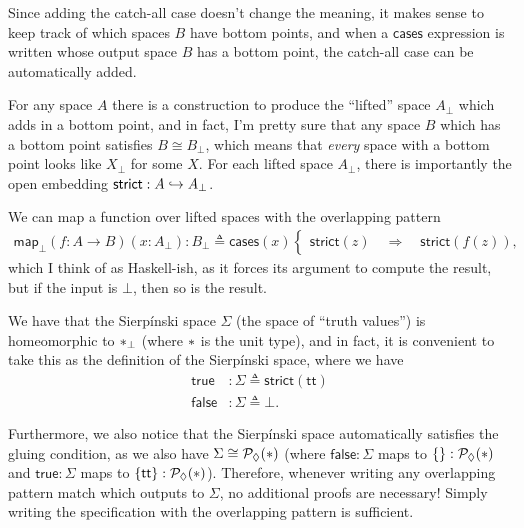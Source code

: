 Since adding the catch-all case doesn't change the meaning, it makes sense to keep track of which spaces $B$ have bottom points, and when a $\mathsf{cases}$ expression is written whose output space $B$ has a bottom point, the catch-all case can be automatically added.

For any space $A$ there is a construction to produce the ``lifted'' space $A_\bot$ which adds in a bottom point, and in fact, I'm pretty sure that any space $B$ which has a bottom point satisfies $B \cong B_\bot$, which means that \emph{every} space with a bottom point looks like $X_\bot$ for some $X$. For each lifted space $A_\bot$, there is importantly the open embedding $\mathsf{strict} : A \hookrightarrow A_\bot$.

We can map a function over lifted spaces with the overlapping pattern
\begin{align*}
\mathsf{map}_\bot(f : A \to B)(x : A_\bot) : B_\bot \triangleq
  \mathsf{cases}(x)
  \begin{cases}
  \mathsf{strict}(z) \quad \Longrightarrow \quad \mathsf{strict}(f(z)),
  \end{cases}
\end{align*}
which I think of as Haskell-ish, as it forces its argument to compute the result, but if the input is $\bot$, then so is the result.

We have that the Sierpínski space $\Sigma$ (the space of ``truth values'') is homeomorphic to $\ast_\bot$ (where $\ast$ is the unit type), and in fact, it is convenient to take this as the definition of the Sierpínski space, where we have
\begin{align*}
\mathsf{true} &: \Sigma \triangleq \mathsf{strict}(\mathsf{tt})
\\ \mathsf{false} &: \Sigma \triangleq \bot.
\end{align*}

Furthermore, we also notice that the Sierpínski space automatically satisfies the gluing condition, as we also have $\Sigma \cong \mathcal{P}_\lozenge(\ast)$ (where $\mathsf{false} : \Sigma$ maps to $\{ \} : \mathcal{P}_\lozenge(\ast)$ and $\mathsf{true} : \Sigma$ maps to $\{ \mathsf{tt} \} : \mathcal{P}_\lozenge(\ast)$). Therefore, whenever writing any overlapping pattern match which outputs to $\Sigma$, no additional proofs are necessary! Simply writing the specification with the overlapping pattern is sufficient.

